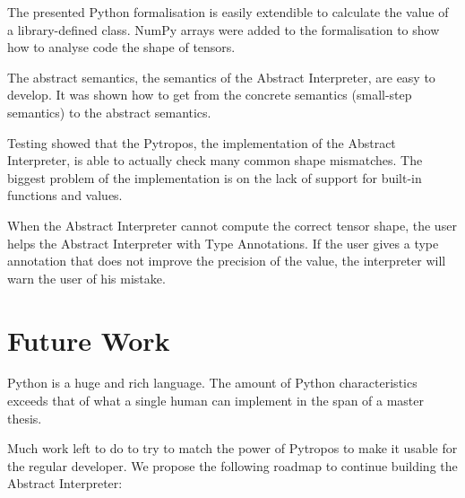 The presented Python formalisation is easily extendible to calculate the value of a
library-defined class. NumPy arrays were added to the formalisation to show how to analyse
code the shape of tensors.


The abstract semantics, the semantics of the Abstract Interpreter, are easy to develop. It
was shown how to get from the concrete semantics (small-step semantics) to the abstract
semantics.

Testing showed that the Pytropos, the implementation of the Abstract Interpreter, is able
to actually check many common shape mismatches. The biggest problem of the implementation
is on the lack of support for built-in functions and values.

When the Abstract Interpreter cannot compute the correct tensor shape, the user helps
the Abstract Interpreter with Type Annotations. If the user gives a type annotation that
does not improve the precision of the value, the interpreter will warn the user of his
mistake.

\section{Future Work}\label{future-work}

Python is a huge and rich language. The amount of Python characteristics exceeds that of
what a single human can implement in the span of a master thesis.

Much work left to do to try to match the power of Pytropos to make it usable for the
regular developer. We propose the following roadmap to continue building the Abstract
Interpreter:

